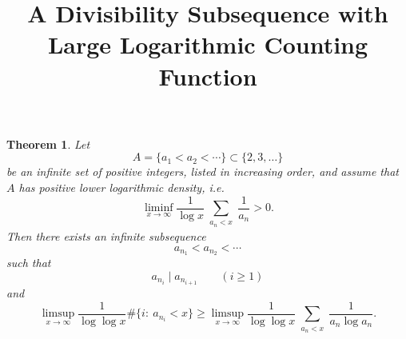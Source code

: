 \documentclass[11pt,letterpaper,reqno]{amsart}
\newtheorem{theorem}{Theorem}[section]
\theoremstyle{definition}
\numberwithin{equation}{section}
\newcommand{\1}{\mathbf 1}
\begin{document}
\title{A Divisibility Subsequence with Large Logarithmic Counting Function}

\maketitle

\begin{theorem}
Let
\[
A=\{a_1<a_2<\cdots\}\subset \{2,3,\dots\}
\]
be an infinite set of positive integers, listed in increasing order, and assume that \(A\) has positive lower logarithmic density, i.e.
\[
\liminf_{x\to\infty}\frac{1}{\log x}\sum_{\substack{a_n<x}}\frac1{a_n}>0.
\]
Then there exists an infinite subsequence
\[
a_{n_1}<a_{n_2}<\cdots
\]
such that
\[
a_{n_i}\mid a_{n_{i+1}}\qquad (i\ge 1)
\]
and
\[
\limsup_{x\to\infty}\frac{1}{\log\log x}\#\{i:\ a_{n_i}<x\}
\ge
\limsup_{x\to\infty}\frac{1}{\log\log x}\sum_{\substack{a_n<x}}\frac{1}{a_n\log a_n}.
\]
\end{theorem}
\end{document}
